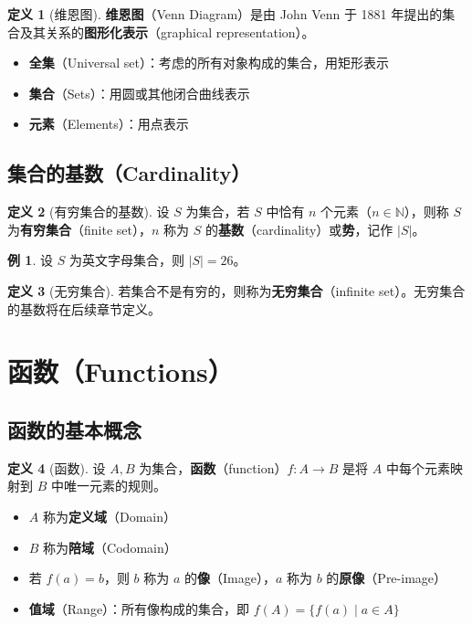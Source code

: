 \documentclass[UTF8,11pt,a4paper]{ctexbook}   %
\theoremstyle{definition}
\newtheorem{definition}{定义}[section]
\newtheorem{example}{例}[section]
\begin{document}
\begin{definition}[维恩图]
\textbf{维恩图}（Venn Diagram）是由 John Venn 于 1881 年提出的集合及其关系的\textbf{图形化表示}（graphical representation）。
\end{definition}

\begin{itemize}[leftmargin=2em]
    \item \textbf{全集}（Universal set）：考虑的所有对象构成的集合，用矩形表示
    \item \textbf{集合}（Sets）：用圆或其他闭合曲线表示
    \item \textbf{元素}（Elements）：用点表示
\end{itemize}

\subsection{集合的基数（Cardinality）}

\begin{definition}[有穷集合的基数]
设 $S$ 为集合，若 $S$ 中恰有 $n$ 个元素（$n \in \mathbb{N}$），则称 $S$ 为\textbf{有穷集合}（finite set），$n$ 称为 $S$ 的\textbf{基数}（cardinality）或\textbf{势}，记作 $|S|$。
\end{definition}

\begin{example}
设 $S$ 为英文字母集合，则 $|S| = 26$。
\end{example}

\begin{definition}[无穷集合]
若集合不是有穷的，则称为\textbf{无穷集合}（infinite set）。无穷集合的基数将在后续章节定义。
\end{definition}

\section{函数（Functions）}

\subsection{函数的基本概念}

\begin{definition}[函数]
设 $A, B$ 为集合，\textbf{函数}（function）$f: A \to B$ 是将 $A$ 中每个元素映射到 $B$ 中唯一元素的规则。
\begin{itemize}
    \item $A$ 称为\textbf{定义域}（Domain）
    \item $B$ 称为\textbf{陪域}（Codomain）
    \item 若 $f(a) = b$，则 $b$ 称为 $a$ 的\textbf{像}（Image），$a$ 称为 $b$ 的\textbf{原像}（Pre-image）
    \item \textbf{值域}（Range）：所有像构成的集合，即 $f(A) = \{f(a) \mid a \in A\}$
\end{itemize}
\end{definition}
\end{document}
